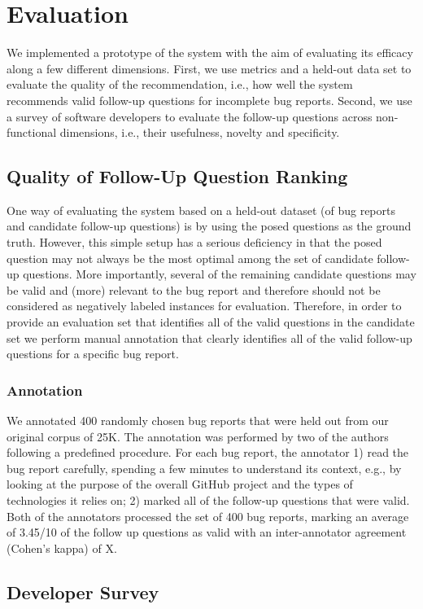 \section{Evaluation}

We implemented a prototype of the system with the aim of evaluating its efficacy along
a few different dimensions. First, we use metrics and a held-out data set to evaluate the quality
of the recommendation, i.e., how well the system recommends valid follow-up questions for incomplete bug reports.
Second, we use a survey of software developers to evaluate the follow-up questions across non-functional
dimensions, i.e., their usefulness, novelty and specificity.


\subsection{Quality of Follow-Up Question Ranking}

One way of evaluating the system based on a held-out dataset (of bug reports and candidate follow-up questions) is
by using the posed questions as the ground truth. However, this simple setup has a serious deficiency in that the posed question
may not always be the most optimal among the set of candidate follow-up questions. More importantly, several of
the remaining candidate questions may be valid and (more) relevant to the bug report and therefore should
not be considered as negatively labeled instances for evaluation. Therefore, in order to provide an evaluation
set that identifies all of the valid questions in the candidate set we perform manual annotation that clearly
identifies all of the valid follow-up questions for a specific bug report.

\subsubsection{Annotation}

We annotated 400 randomly chosen bug reports that were held out from our original corpus of 25K. The annotation
was performed by two of the authors following a predefined procedure. For each bug report, the annotator 1)
read the bug report carefully, spending a few minutes to understand its context, e.g., by looking at the purpose of the overall GitHub
project and the types of technologies it relies on; 2) marked all of the follow-up questions that were valid.
Both of the annotators processed the set of 400 bug reports, marking an average of 3.45/10 of the follow up questions
as valid with an inter-annotator agreement (Cohen's kappa) of X. 

\subsection{Developer Survey}
